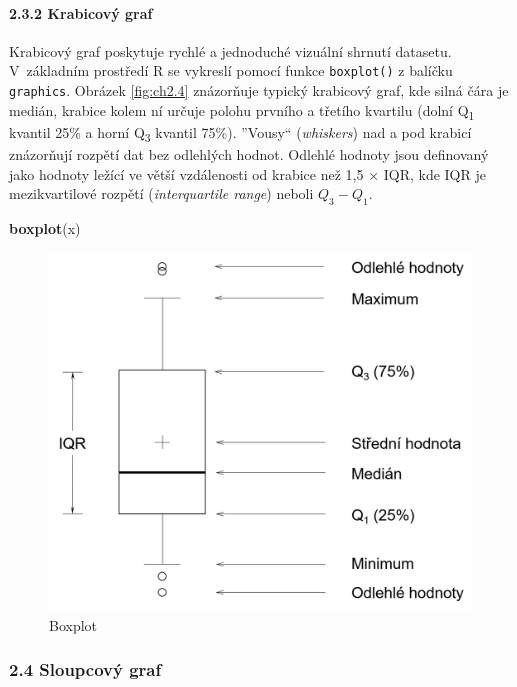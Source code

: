\documentclass[12pt,]{article}
\newenvironment{Shaded}{\begin{snugshade}}{\end{snugshade}}
\newcommand{\KeywordTok}[1]{\textcolor[rgb]{0.13,0.29,0.53}{\textbf{#1}}}
\newcommand{\NormalTok}[1]{#1}
\let\oldparagraph\paragraph
\renewcommand{\paragraph}[1]{\oldparagraph{#1}\mbox{}}
\begin{document}
\newpage

\hypertarget{boxplot}{\paragraph{2.3.2 Krabicový graf}\label{boxplot}}

\qquad Krabicový graf poskytuje rychlé a jednoduché vizuální shrnutí
datasetu. V~základním prostředí R se vykreslí pomocí funkce
\texttt{boxplot()} z balíčku \texttt{graphics}. Obrázek \ref{fig:ch2.4}
znázorňuje typický krabicový graf, kde silná čára je medián, krabice
kolem ní určuje polohu prvního a třetího kvartilu (dolní
Q\textsubscript{1} kvantil 25\% a horní Q\textsubscript{3} kvantil
75\%). ''Vousy`` (\emph{whiskers}) nad a pod krabicí znázorňují rozpětí
dat bez odlehlých hodnot. Odlehlé hodnoty jsou definovaný jako hodnoty
ležící ve větší vzdálenosti od krabice než 1,5 \(\times\) IQR, kde IQR
je mezikvartilové rozpětí (\emph{interquartile range}) neboli
\(Q_3 - Q_1\).

\begin{Shaded}
\begin{Highlighting}[]
\KeywordTok{boxplot}\NormalTok{(x)}
\end{Highlighting}
\end{Shaded}

\begin{figure}[H]

{\centering \includegraphics[width=0.65\linewidth]{fig/boxplot} 

}

\caption{\label{fig:ch2.4} Boxplot}\label{fig:boxplot_img}
\end{figure}

\newpage

\subsubsection{2.4 Sloupcový graf}\label{sloupcovy-graf}
\end{document}
